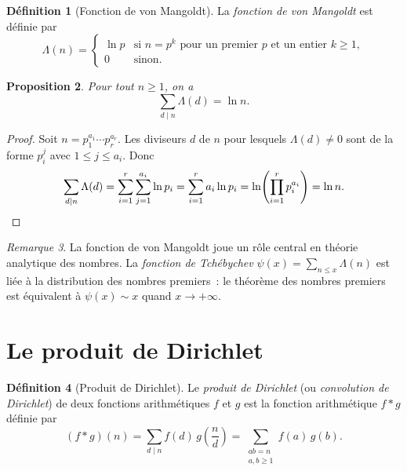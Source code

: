 \documentclass[12pt,a4paper,openany]{book}
\theoremstyle{definition}
\newtheorem{definition}{Définition}[chapter]
\theoremstyle{plain}
\newtheorem{proposition}[definition]{Proposition}
\theoremstyle{remark}
\newtheorem{remarque}[definition]{Remarque}
\begin{document}
\begin{definition}[Fonction de von Mangoldt]
\label{def:von-mangoldt}
La \emph{fonction de von Mangoldt} est définie par
\[
  \Lambda(n) = \begin{cases}
    \ln p & \text{si } n = p^k \text{ pour un premier } p \text{ et un entier } k \geq 1, \\
    0 & \text{sinon.}
  \end{cases}
\]
\end{definition}

\begin{proposition}
\label{prop:von-mangoldt-identite}
Pour tout $n \geq 1$, on a
\[
  \sum_{d \mid n} \Lambda(d) = \ln n.
\]
\end{proposition}

\begin{proof}
Soit $n = p_1^{a_1} \cdots p_r^{a_r}$. Les diviseurs $d$ de $n$ pour lesquels
$\Lambda(d) \neq 0$ sont de la forme $p_i^j$ avec $1 \leq j \leq a_i$. Donc
\[
  \sum_{d \mid n} \Lambda(d) = \sum_{i=1}^{r} \sum_{j=1}^{a_i} \ln p_i
    = \sum_{i=1}^{r} a_i \ln p_i = \ln\!\left(\prod_{i=1}^r p_i^{a_i}\right) = \ln n.
    \qedhere
\]
\end{proof}

\begin{remarque}
\label{rem:von-mangoldt-importance}
La fonction de von Mangoldt joue un rôle central en théorie analytique des nombres. La
\emph{fonction de Tchébychev}
$\psi(x) = \sum_{n \leq x} \Lambda(n)$ est liée à la distribution des nombres premiers~:
le théorème des nombres premiers est équivalent à $\psi(x) \sim x$ quand $x \to +\infty$.
\end{remarque}

\section{Le produit de Dirichlet}
\label{sec:dirichlet-convolution}

\begin{definition}[Produit de Dirichlet]
\label{def:dirichlet-convolution}
Le \emph{produit de Dirichlet} (ou \emph{convolution de Dirichlet}) de deux fonctions
arithmétiques $f$ et $g$ est la fonction arithmétique $f * g$ définie par
\[
  (f * g)(n) = \sum_{d \mid n} f(d)\, g\!\left(\frac{n}{d}\right)
    = \sum_{\substack{ab = n \\ a, b \geq 1}} f(a)\, g(b).
\]
\end{definition}
\end{document}
